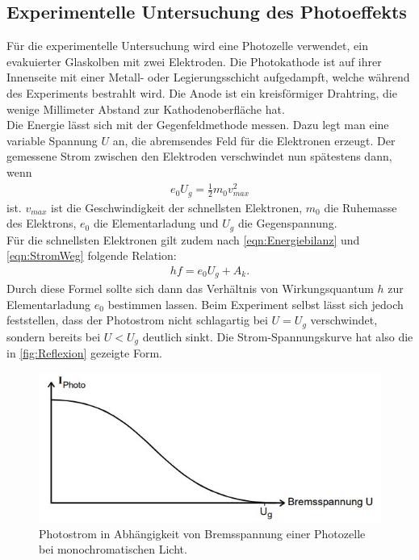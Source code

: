 \subsection{Experimentelle Untersuchung des Photoeffekts}

Für die experimentelle Untersuchung wird eine Photozelle verwendet, 
ein evakuierter Glaskolben mit zwei Elektroden. Die Photokathode ist auf
ihrer Innenseite mit einer Metall- oder Legierungsschicht aufgedampft,
welche während des Experiments bestrahlt wird. Die Anode ist ein kreisförmiger Drahtring,
die wenige Millimeter Abstand zur Kathodenoberfläche hat.\\
Die Energie lässt sich mit der Gegenfeldmethode messen. Dazu legt man 
eine variable Spannung $U$ an, die abremsendes Feld für die Elektronen erzeugt.
Der gemessene Strom zwischen den Elektroden verschwindet nun spätestens dann,
wenn 
\begin{align}
    \label{eqn:StromWeg}
    e_0 U_g = \frac{1}{2} m_0 v^2_{max}
\end{align}
ist. $v_{max}$ ist die Geschwindigkeit der schnellsten Elektronen, $m_0$ die Ruhemasse
des Elektrons, $e_0$ die Elementarladung und $U_g$ die Gegenspannung.\\
Für die schnellsten Elektronen gilt zudem nach \autoref{eqn:Energiebilanz} und 
\autoref{eqn:StromWeg} folgende Relation:
\begin{align}
    \label{eqn:1und2}
    hf = e_0 U_g + A_k.
\end{align}
Durch diese Formel sollte sich dann das Verhältnis von Wirkungsquantum $h$ zur
Elementarladung $e_0$ bestimmen lassen. Beim Experiment selbst lässt sich jedoch 
feststellen, dass der Photostrom nicht schlagartig bei $U = U_g$ verschwindet, sondern 
bereits bei $U < U_g$ deutlich sinkt. Die Strom-Spannungskurve hat also
die in \autoref{fig:Reflexion} gezeigte Form.
\begin{figure}
        \centering
        \includegraphics{Bilder/PhotoStrom1.jpg}
        \caption{Photostrom in Abhängigkeit von Bremsspannung einer Photozelle bei monochromatischen Licht.\cite{sample}}
        \label{fig:Reflexion}
\end{figure}
